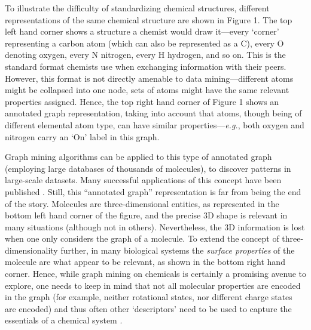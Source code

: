 \documentclass{sig-alternate}
\begin{document}
To illustrate the difficulty of standardizing chemical structures, different
representations of the same chemical structure are shown in Figure 1. The top
left hand corner shows a structure a chemist would draw it---every `corner'
representing a carbon atom (which can also be represented as a C), every O
denoting oxygen, every N nitrogen, every H hydrogen, and so on. This is the
standard format chemists use when exchanging information with their peers.
However, this format is not directly amenable to data mining---different atoms might
be collapsed into one node, sets of atoms might have the same relevant
properties assigned. Hence, the top right hand corner of Figure 1 shows an
annotated graph representation, taking into account that atoms, though being of
different elemental atom type, can have similar properties---\emph{e.g.}, both oxygen
and nitrogen carry an `On' label in this graph.


Graph mining algorithms can be applied to this type of annotated graph
(employing large databases of thousands of molecules), to discover
patterns in large-scale datasets.  Many successful applications of
this concept have been published \cite{wegner2006,horst2009}. Still,
this ``annotated graph'' representation is far from being the end of
the story. Molecules are three-dimensional entities, as represented in
the bottom left hand corner of the figure, and the precise 3D shape is
relevant in many situations (although not in others).  Nevertheless, the
3D information is lost when one only considers the graph of a
molecule. To extend the concept of three-dimensionality further, in
many biological systems the \emph{surface properties} of the molecule
are what appear to be relevant, as shown in the bottom right hand
corner.  Hence, while graph mining on chemicals is certainly a
promising avenue to explore, one needs to keep in mind that not all
molecular properties are encoded in the graph (for example, neither
rotational states, nor different charge states are encoded) and thus
often other `descriptors' need to be used to capture the essentials of
a chemical system \cite{bender2004}.
\end{document}
